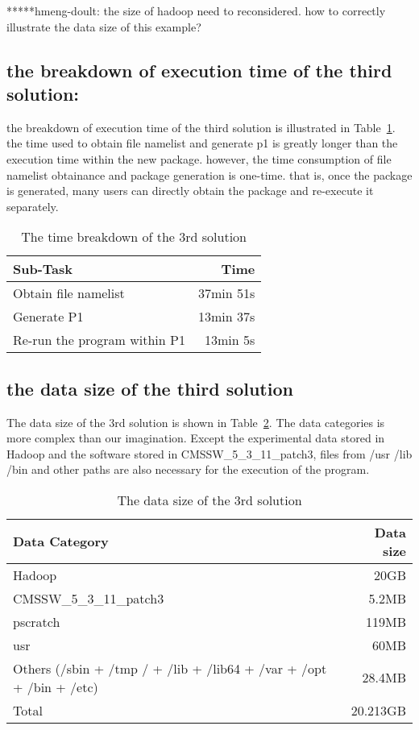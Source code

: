 \documentclass{article}
\begin{document}
*****hmeng-doult: the size of hadoop need to reconsidered. how to correctly illustrate the data size of this example?\\

\subsection{the breakdown of execution time of the third solution: }
\indent the breakdown of execution time of the third solution is illustrated in Table~\ref{table:time-3rd}. the time used to obtain file namelist and generate p1 is greatly longer than the execution time within the new package. however, the time consumption of file namelist obtainance and package generation is one-time. that is, once the package is generated, many users can directly obtain the package and re-execute it separately.\\

\begin{table}
    \centering
    \begin{tabular}{|l|r|}
    \hline
    Sub-Task & Time \\ \hline
    Obtain file namelist & 37min 51s \\ \hline
    Generate P1 & 13min 37s \\ \hline
    Re-run the program within P1 & 13min 5s \\ \hline
    \end{tabular}
    \caption{The time breakdown of the 3rd solution}
    \label{table:time-3rd}
\end{table}

\subsection{ the data size of the third solution}
\indent The data size of the 3rd solution is shown in Table~\ref{table:datasize-3rd}. The data categories is more complex than our imagination. Except the experimental data stored in Hadoop and the software stored in CMSSW\_5\_3\_11\_patch3, files from /usr /lib /bin and other paths are also necessary for the execution of the program.\\

\begin{table}
    \centering
    \begin{tabular}{|l|r|}
    \hline
    Data Category & Data size \\ \hline
    Hadoop & 20GB \\ \hline
    CMSSW\_5\_3\_11\_patch3 & 5.2MB \\ \hline
    pscratch & 119MB \\ \hline
    usr & 60MB \\ \hline
    Others (/sbin + /tmp / + /lib + /lib64 + /var + /opt + /bin + /etc) & 28.4MB \\ \hline
    Total & 20.213GB \\ \hline
    \end{tabular}
    \caption{The data size of the 3rd solution}
    \label{table:datasize-3rd}
\end{table}    
\end{document}
